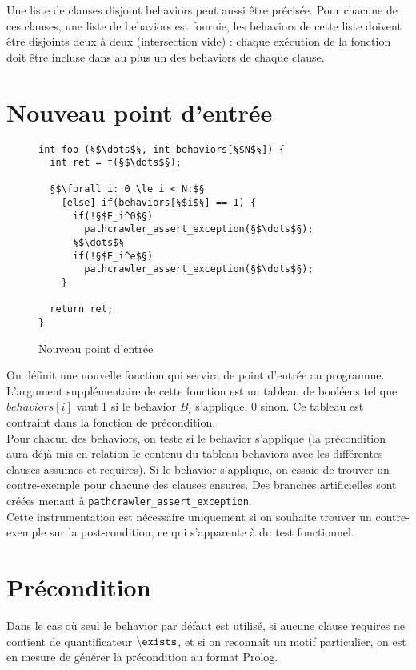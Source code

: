 Une liste de clauses disjoint behaviors peut aussi être précisée. Pour chacune
de ces clauses, une liste de behaviors est fournie, les behaviors de cette liste
doivent être disjoints deux à deux (intersection vide) : chaque exécution de la
fonction doit être incluse dans au plus un des behaviors de chaque clause.


\section{Nouveau point d'entrée}


\begin{figure}[h]
  \begin{lstlisting}
int foo (§$\dots$§, int behaviors[§$N$§]) {
  int ret = f(§$\dots$§);

  §$\forall i: 0 \le i < N:$§
    [else] if(behaviors[§$i$§] == 1) {
      if(!§$E_i^0$§)
        pathcrawler_assert_exception(§$\dots$§);
      §$\dots$§
      if(!§$E_i^e$§)
        pathcrawler_assert_exception(§$\dots$§);
    }

  return ret;
}
  \end{lstlisting}
  \caption{Nouveau point d'entrée}
\end{figure}

On définit une nouvelle fonction qui servira de point d'entrée au programme.
L'argument supplémentaire de cette fonction est un tableau de booléens tel
que $behaviors[i]$ vaut 1 si le behavior $B_i$ s'applique, 0 sinon. Ce tableau
est contraint dans la fonction de précondition.\\

Pour chacun des behaviors, on teste si le behavior s'applique (la précondition
aura déjà mis en relation le contenu du tableau behaviors avec les différentes
clauses assumes et requires). Si le behavior s'applique, on essaie de trouver un
contre-exemple pour chacune des clauses ensures. Des branches artificielles sont
créées menant à {\tt pathcrawler\_assert\_exception}.\\

Cette instrumentation est nécessaire uniquement si on souhaite trouver un
contre-exemple sur la post-condition, ce qui s'apparente à du test fonctionnel.

\section{Précondition}


Dans le cas où seul le behavior par défaut est utilisé, si aucune clause
requires ne contient de quantificateur ${\tt \backslash exists}$, et si on
reconnaît un motif particulier, on est en mesure de générer la précondition au
format Prolog.\\

